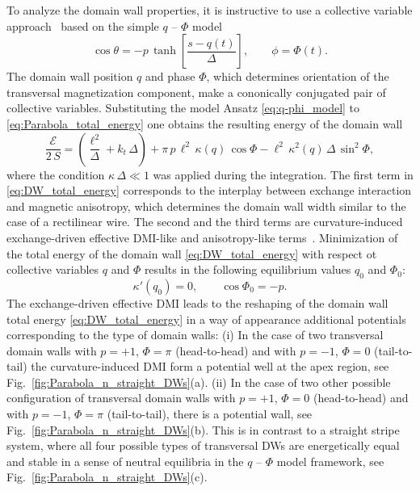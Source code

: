 To analyze the domain wall properties, it is instructive to use a collective variable approach~\cite{Slonczewski72,Thiele73} based on the simple $q$ -- $\Phi$ model~\cite{Slonczewski72,Malozemoff79} 
\begin{equation} \label{eq:q-phi_model}
	\cos \theta = - p \, \tanh \left[ \dfrac{s-q(t)}{\Delta} \right], \qquad \phi = \Phi(t).
\end{equation}
The domain wall position $q$ and phase $\Phi$, which determines orientation of the transversal magnetization component, make a cononically conjugated pair of collective variables. Substituting the model Ansatz \eqref{eq:q-phi_model} to \eqref{eq:Parabola_total_energy} one obtains the resulting energy of the domain wall~\cite{Yershov15b}
\begin{equation} \label{eq:DW_total_energy}
	\dfrac{\mathcal{E}}{2 \, S} = \left( \dfrac{\ell^2}{\Delta} + k_t \, \Delta \right) + \pi \, p \, \ell^2 \, \kappa(q) \, \cos\Phi - \ell^2 \, \kappa^2(q) \, \Delta \, \sin^2 \Phi,
\end{equation}
where the condition $\kappa \, \Delta \ll 1$ was applied during the integration. The first term in \eqref{eq:DW_total_energy} corresponds to the interplay between exchange interaction and magnetic anisotropy, which determines the domain wall width similar to the case of a rectilinear wire. The second and the third terms are curvature-induced exchange-driven effective DMI-like and anisotropy-like terms~\cite{Yershov15b,Sheka15}. Minimization of the total energy of the domain wall \eqref{eq:DW_total_energy} with respect ot collective variables $q$ and $\Phi$ results in the following equilibrium values $q_0$ and $\Phi_0$:
\begin{equation} \label{eq:qPhi_equilibrium}
	\kappa'(q_0) = 0, \qquad \cos \Phi_0 = -p.
\end{equation} 
The exchange-driven effective DMI leads to the reshaping of the domain wall total energy \eqref{eq:DW_total_energy} in a way of appearance additional potentials corresponding to the type of domain walls: (i) In the case of two transversal domain walls with $p=+1$, $\Phi=\pi$ (head-to-head) and with $p=-1$, $\Phi=0$ (tail-to-tail) the curvature-induced DMI form a potential well at the apex region, see Fig.~\ref{fig:Parabola_n_straight_DWs}(a). (ii) In the case of two other possible configuration of transversal domain walls with $p=+1$, $\Phi=0$ (head-to-head) and with $p=-1$, $\Phi=\pi$ (tail-to-tail), there is a potential wall, see Fig.~\ref{fig:Parabola_n_straight_DWs}(b).  This is in contrast to a straight stripe system, where all four possible types of transversal DWs are energetically equal and stable in a sense of neutral equilibria in the $q$ -- $\Phi$ model framework, see Fig.~\ref{fig:Parabola_n_straight_DWs}(c).

